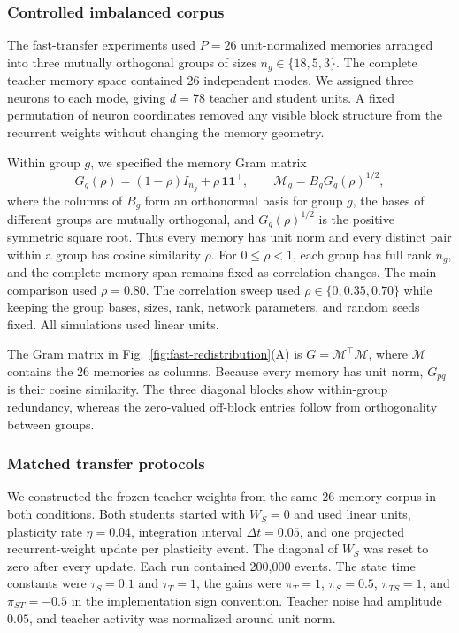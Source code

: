 \documentclass[10pt,letterpaper]{article}
\theoremstyle{plain}
\theoremstyle{remark}
\begin{document}
\subsubsection{Controlled imbalanced corpus}

The fast-transfer experiments used $P=26$ unit-normalized memories arranged into three mutually orthogonal groups of sizes $n_g\in\{18,5,3\}$. The complete teacher memory space contained 26 independent modes. We assigned three neurons to each mode, giving $d=78$ teacher and student units. A fixed permutation of neuron coordinates removed any visible block structure from the recurrent weights without changing the memory geometry.

Within group $g$, we specified the memory Gram matrix
\begin{equation}
G_g(\rho)=(1-\rho)I_{n_g}+\rho\,\mathbf 1\mathbf 1^\top,
\qquad
\mathcal M_g=B_gG_g(\rho)^{1/2},
\label{eq:grouped-memory-corpus}
\end{equation}
where the columns of $B_g$ form an orthonormal basis for group $g$, the bases of different groups are mutually orthogonal, and $G_g(\rho)^{1/2}$ is the positive symmetric square root. Thus every memory has unit norm and every distinct pair within a group has cosine similarity $\rho$. For $0\leq\rho<1$, each group has full rank $n_g$, and the complete memory span remains fixed as correlation changes. The main comparison used $\rho=0.80$. The correlation sweep used $\rho\in\{0,0.35,0.70\}$ while keeping the group bases, sizes, rank, network parameters, and random seeds fixed. All simulations used linear units.

The Gram matrix in Fig.~\ref{fig:fast-redistribution}(A) is $G=\mathcal M^\top\mathcal M$, where $\mathcal M$ contains the 26 memories as columns. Because every memory has unit norm, $G_{pq}$ is their cosine similarity. The three diagonal blocks show within-group redundancy, whereas the zero-valued off-block entries follow from orthogonality between groups.

\subsubsection{Matched transfer protocols}

We constructed the frozen teacher weights from the same 26-memory corpus in both conditions. Both students started with $W_S=0$ and used linear units, plasticity rate $\eta=0.04$, integration interval $\Delta t=0.05$, and one projected recurrent-weight update per plasticity event. The diagonal of $W_S$ was reset to zero after every update. Each run contained 200,000 events. The state time constants were $\tau_S=0.1$ and $\tau_T=1$, the gains were $\pi_T=1$, $\pi_S=0.5$, $\pi_{TS}=1$, and $\pi_{ST}=-0.5$ in the implementation sign convention. Teacher noise had amplitude $0.05$, and teacher activity was normalized around unit norm.
\end{document}
